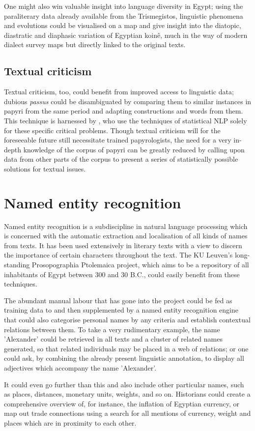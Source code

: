 One might also win valuable insight into language diversity in Egypt;
using the paraliterary data already available from the Trismegistos,
linguistic phenomena and evolutions could be visualised on a map and
give insight into the diatopic, diastratic and diaphasic variation of
Egyptian koin\^e, much in the way of modern dialect survey maps but
directly linked to the original texts.

\subsection{Textual criticism}
\label{sec:textualcriticism}
Textual criticism, too, could benefit from improved access to
linguistic data; dubious \textit{passus} could be disambiguated by
comparing them to similar instances in papyri from the same period and
adapting constructions and words from them.  This technique is
harnessed by \cite{mimno2009}, who use the techniques of statistical
NLP solely for these specific critical problems.  Though textual
criticism will for the foreseeable future still necessitate trained
papyrologists, the need for a very in-depth knowledge of the corpus of
papyri can be greatly reduced by calling upon data from other parts of
the corpus to present a series of statistically possible solutions for
textual issues.

\section{Named entity recognition}
\label{sec:ner}

Named entity recognition is a subdiscipline in natural language
processing which is concerned with the automatic extraction and
localisation of all kinds of names from texts. It has been used
extensively in literary texts with a view to discern the importance of
certain characters throughout the text. The KU Leuven's long-standing
Prosopographia Ptolemaica project, which aims to be a repository of
all inhabitants of Egypt between 300 and 30 B.C., could easily benefit
from these techniques. 

The abundant manual labour that has gone into the project could be fed
as training data to and then supplemented by a named entity
recognition engine that could also categorise personal names by any
criteria and establish contextual relations between them. To take a
very rudimentary example, the name 'Alexander' could be retrieved in
all texts and a cluster of related names generated, so that related
individuals may be placed in a web of relations; or one could ask, by
combining the already present linguistic annotation, to display all
adjectives which accompany the name 'Alexander'.

It could even go further than this and also include other particular
names, such as places, distances, monetary units, weights, and so
on. Historians could create a comprehensive overview of, for instance,
the inflation of Egyptian currency, or map out trade connections using
a search for all mentions of currency, weight and places which are in
proximity to each other.